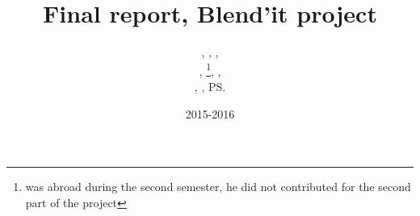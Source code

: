 \documentclass[a4paper,11pt]{article}
\title{Final report, Blend'it project}
\author{\bb, \gc, \dl,\\ \vl, \om\footnote{was abroad during the second semester, he did not contributed for the second part of the project}, \mr,\\ \me, \js, \ps}
\date{2015-2016}
\begin{document}
\maketitle

\begin{abstract}
\end{abstract}

\newpage
{}

\tableofcontents

\newpage


\newpage


\newpage


\newpage


\newpage




\newpage
\begingroup




\endgroup
\end{document}
